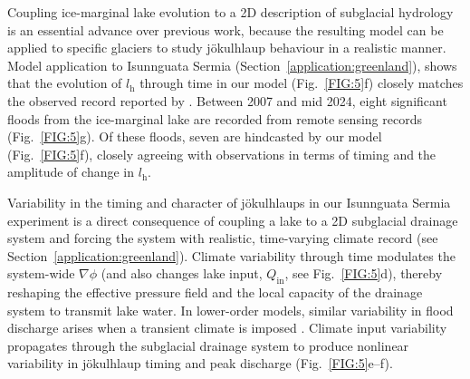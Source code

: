 \documentclass[tc, manuscript]{copernicus}
\begin{document}
Coupling ice-marginal lake evolution to a 2D description of subglacial hydrology is an essential advance over previous work, because the resulting model can be applied to specific glaciers to study jökulhlaup behaviour in a realistic manner. Model application to Isunnguata Sermia (Section~\ref{application:greenland}), shows that the evolution of $l_{\mathrm{h}}$ through time in our model (Fig.~\ref{FIG:5}f) closely matches the observed record reported by \citet[][Fig.~\ref{FIG:5},g]{livingstone2025ice}. Between 2007 and mid 2024, eight significant floods from the ice-marginal lake are recorded from remote sensing records (Fig.~\ref{FIG:5}g). Of these floods, seven are hindcasted by our model (Fig.~\ref{FIG:5}f), closely agreeing with observations in terms of timing and the amplitude of change in $l_{\mathrm{h}}$. 

Variability in the timing and character of jökulhlaups in our Isunnguata Sermia experiment is a direct consequence of coupling a lake to a 2D subglacial drainage system and forcing the system with realistic, time-varying climate record (see Section~\ref{application:greenland}). Climate variability through time modulates the system-wide $\nabla \phi$ (and also changes lake input, $Q_{\mathrm{in}}$, see Fig.~\ref{FIG:5}d), thereby reshaping the effective pressure field and the local capacity of the drainage system to transmit lake water. In lower-order models, similar variability in flood discharge arises when a transient climate is imposed \citep{kingslake2015chaotic, ng2009temporal}. Climate input variability propagates through the subglacial drainage system to produce nonlinear variability in jökulhlaup timing and peak discharge (Fig.~\ref{FIG:5}e--f). %
\end{document}
